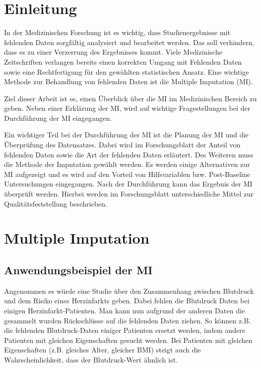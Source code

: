 \section{Einleitung}
\label{section:Introduction}

In der Medizinischen Forschung ist es wichtig, dass Studienergebnisse mit 
fehlenden Daten sorgfältig analysiert und bearbeitet werden. Das soll verhindern, dass es zu einer Verzerrung des 
Ergebnisses kommt. Viele Medizinische Zeitschriften verlangen bereits einen korrekten Umgang mit Fehlenden Daten sowie 
eine Rechtfertigung für den gewählten statistischen Ansatz. \autocite[163]{Lee2014} 
Eine wichtige Methode zur Behandlung von fehlenden Daten ist die Multiple Imputation (MI).

Ziel dieser Arbeit ist es, einen Überblick über die MI im Medizinischen Bereich zu geben. Neben einer 
Erklärung der MI, wird auf wichtige Fragestellungen bei der Durchführung der MI eingegangen.

Ein wichtiger Teil bei der Durchführung der MI ist die Planung der MI und die Überprüfung des Datensatzes. 
Dabei wird im Forschungsblatt der Anteil von fehlenden Daten sowie die Art der fehlenden Daten erläutert. 
Des Weiteren muss die Methode der Imputation gewählt werden. Es werden einige Alternativen zur MI aufgezeigt und es 
wird auf den Vorteil von Hilfsvariablen bzw. Post-Baseline Untersuchungen eingegangen. Nach der Durchführung
kann das Ergebnis der MI überprüft werden. Hierbei werden im Forschungsblatt unterschiedliche Mittel zur 
Qualitätsfeststellung beschrieben.


\section{Multiple Imputation}
\label{section:MI}

\subsection{Anwendungsbeispiel der MI}

Angenommen es würde eine Studie über den Zusammenhang zwischen Blutdruck und dem Risiko eines Herzinfarkts geben. 
Dabei fehlen die Blutdruck Daten bei einigen Herzinfarkt-Patienten. Man kann nun aufgrund der anderen Daten die 
gesammelt wurden Rückschlüsse auf die fehlenden Daten ziehen. So können z.B. die fehlenden Blutdruck-Daten einiger 
Patienten ersetzt werden, indem andere Patienten mit gleichen Eigenschaften gesucht werden. Bei Patienten mit gleichen 
Eigenschaften (z.B. gleiches Alter, gleicher BMI) steigt auch die Wahrscheinlichkeit, dass der Blutdruck-Wert ähnlich ist. 

